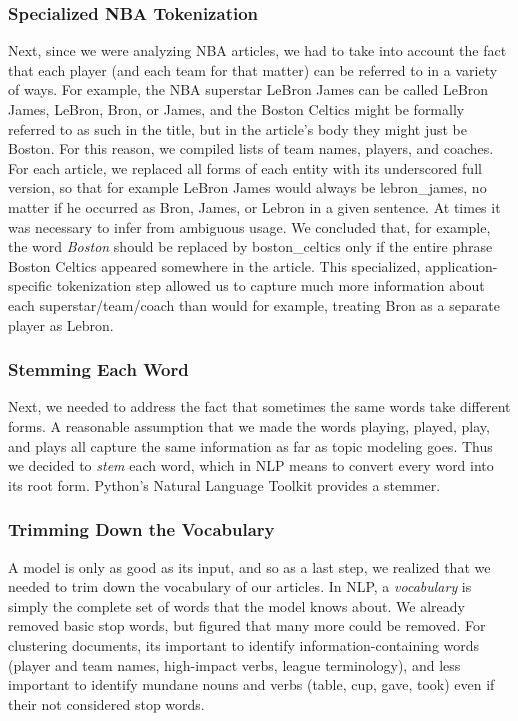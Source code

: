 \documentclass[11pt]{article}
\begin{document}
\subsubsection{Specialized NBA Tokenization}
Next, since we were analyzing NBA articles, we had to take into account the fact that each player (and each team for that matter) can be referred to in a variety of ways. For example, the NBA superstar LeBron James can be called LeBron James, LeBron, Bron, or James, and the Boston Celtics might be formally referred to as such in the title, but in the article's body they might just be Boston. For this reason, we compiled lists of team names, players, and coaches.  For each article, we replaced all forms of each entity with its underscored full version, so that for example LeBron James would always be lebron\_james, no matter if he occurred as Bron, James, or Lebron in a given sentence.  At times it was necessary to infer from ambiguous usage. We concluded that, for example, the word \textit{Boston} should be replaced by boston\_celtics only if the entire phrase Boston Celtics appeared somewhere in the article.  This specialized, application-specific tokenization step allowed us to capture much more information about each superstar/team/coach than would for example, treating Bron as a separate player as Lebron. \\

\subsubsection{Stemming Each Word}
Next, we needed to address the fact that sometimes the same words take different forms. A reasonable assumption that we made the words playing, played, play, and plays all capture the same information as far as topic modeling goes. Thus we decided to \textit{stem} each word, which in NLP means to convert every word into its root form.  Python's Natural Language Toolkit provides a stemmer.

\subsubsection{Trimming Down the Vocabulary}
A model is only as good as its input, and so as a last step, we realized that we needed to trim down the vocabulary of our articles. In NLP, a \textit{vocabulary} is simply the complete set of words that the model knows about.  We already removed basic stop words, but figured that many more could be removed. For clustering documents, its important to identify information-containing words (player and team names, high-impact verbs, league terminology), and less important to identify mundane nouns and verbs (table, cup, gave, took) even if their not considered stop words. \\
\end{document}
